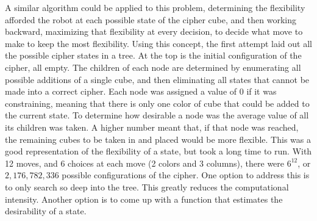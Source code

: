 \documentclass{article}
\begin{document}
A similar algorithm could be applied to this problem, determining the flexibility afforded the robot at each possible state of the cipher cube, and then working backward, maximizing that flexibility at every decision, to decide what move to make to keep the most flexibility. Using this concept, the first attempt laid out all the possible cipher states in a tree. At the top is the initial configuration of the cipher, all empty. The children of each node are determined by enumerating all possible additions of a single cube, and then eliminating all states that cannot be made into a correct cipher. Each node was assigned a value of 0 if it was constraining, meaning that there is only one color of cube that could be added to the current state. To determine how desirable a node was the average value of all its children was taken. A higher number meant that, if that node was reached, the remaining cubes to be taken in and placed would be more flexible. This was a good representation of the flexibility of a state, but took a long time to run. With 12 moves, and 6 choices at each move (2 colors and 3 columns), there were $6^12$, or $2,176,782,336$ possible configurations of the cipher. One option to address this is to only search so deep into the tree. This greatly reduces the computational intensity. Another option is to come up with a function that estimates the desirability of a state.
\end{document}
